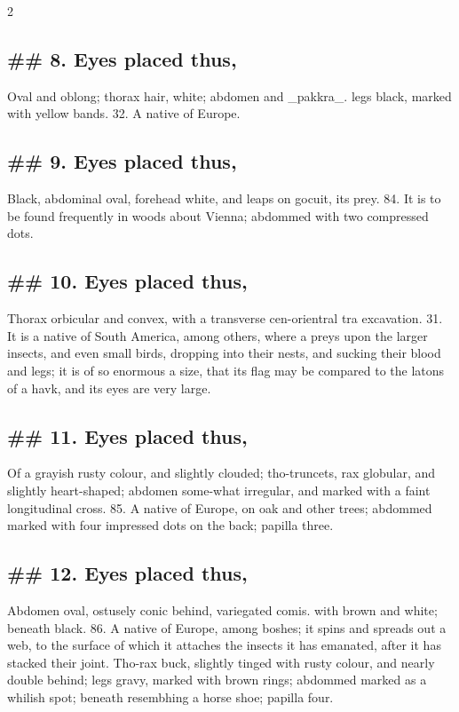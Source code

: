 \documentclass[10pt]{article}
\begin{document}
\begin{multicols}{2}
\subsection*{\#\# 8. Eyes placed thus,}
Oval and oblong; thorax hair, white; abdomen and \_pakkra\_. legs black, marked with yellow bands. 32. A native of Europe.

\subsection*{\#\# 9. Eyes placed thus,}
Black, abdominal oval, forehead white, and leaps on gocuit, its prey. 84. It is to be found frequently in woods about Vienna; abdommed with two compressed dots.

\subsection*{\#\# 10. Eyes placed thus,}
Thorax orbicular and convex, with a transverse cen-orientral tra excavation. 31. It is a native of South America, among others, where a preys upon the larger insects, and even small birds, dropping into their nests, and sucking their blood and legs; it is of so enormous a size, that its flag may be compared to the latons of a havk, and its eyes are very large.

\subsection*{\#\# 11. Eyes placed thus,}
Of a grayish rusty colour, and slightly clouded; tho-truncets, rax globular, and slightly heart-shaped; abdomen some-what irregular, and marked with a faint longitudinal cross. 85. A native of Europe, on oak and other trees; abdommed marked with four impressed dots on the back; papilla three.

\subsection*{\#\# 12. Eyes placed thus,}
Abdomen oval, ostusely conic behind, variegated comis. with brown and white; beneath black. 86. A native of Europe, among boshes; it spins and spreads out a web, to the surface of which it attaches the insects it has emanated, after it has stacked their joint. Tho-rax buck, slightly tinged with rusty colour, and nearly double behind; legs gravy, marked with brown rings; abdommed marked as a whilish spot; beneath resembhing a horse shoe; papilla four.


\end{multicols}
\end{document}
